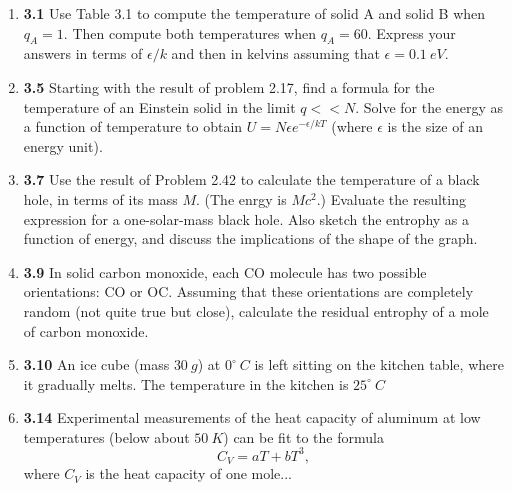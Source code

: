 \documentclass[fleqn]{article}
\begin{document}
  \begin{enumerate}
    \item \textbf{3.1} Use Table 3.1 to compute the temperature of solid A and solid B when $q_A=1$. Then
    compute both temperatures when $q_A=60$. Express your answers in terms of $\epsilon/k$ and then in 
    kelvins assuming that $\epsilon=0.1 ~ eV$.


    \item \textbf{3.5} Starting with the result of problem 2.17, find a formula for the temperature of an Einstein 
    solid in the limit $q << N$. Solve for the energy as a function of temperature to obtain 
    $U=N \epsilon e^{-\epsilon/k T}$ (where $\epsilon$ is the size of an energy unit).


    \item \textbf{3.7} Use the result of Problem 2.42 to calculate the temperature of a black hole, in terms
    of its mass $M$. (The enrgy is $Mc^2$.) Evaluate the resulting expression for a one-solar-mass black hole.
    Also sketch the entrophy as a function of energy, and discuss the implications of the shape of the graph. 


    \item \textbf{3.9} In solid carbon monoxide, each CO molecule has two possible orientations: CO or 
    OC. Assuming that these orientations are completely random (not quite true but close), calculate
    the residual entrophy of a mole of carbon monoxide.


    \item \textbf{3.10} An ice cube (mass $30 ~ g$) at $0^{\circ} ~ C$ is left sitting on the kitchen table,
    where it gradually melts. The temperature in the kitchen is $25^{\circ} ~ C$


    \item \textbf{3.14} Experimental measurements of the heat capacity of aluminum at low temperatures 
    (below about $50 ~ K$) can be fit to the formula
    $$
      C_V=aT+bT^3,
    $$ where $C_V$ is the heat capacity of one mole...


\end{enumerate}
\end{document}
